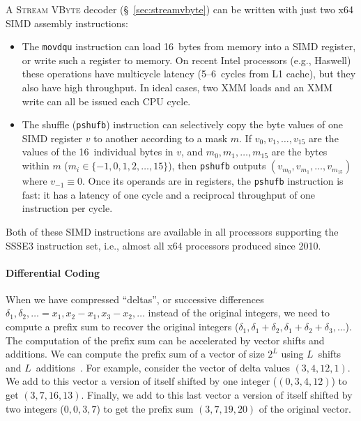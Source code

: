 \documentclass[compress]{elsarticle}
\newcommand{\vbyte}{VByte}
\newcommand{\streamvbyte}{\textsc{Stream \vbyte{}}}
\begin{document}
A \streamvbyte{} decoder (\S~\ref{sec:streamvbyte}) can be written with  just two x64 SIMD assembly instructions:
\begin{itemize}[noitemsep,nolistsep,leftmargin=10pt]
\item The \texttt{movdqu} instruction can load 16~bytes from memory into a SIMD register, or write such a register to memory. On recent Intel processors (e.g., Haswell) these operations have multicycle latency (5--6~cycles from L1 cache), but they also have high   throughput.
In ideal cases, two XMM loads and an XMM write can all be issued each CPU cycle.
\item The shuffle (\texttt{pshufb}) instruction  can selectively copy the
byte values of one SIMD register  $v$ to another according to a mask $m$.
If $v_0, v_1, \ldots, v_{15}$ are the values of the 16~individual bytes in $v$,  and $m_0, m_1, \ldots, m_{15}$ are the bytes within $m$ ($m_i\in\{-1,0,1,2,\ldots, 15\}$), then \texttt{pshufb} outputs $(v_{m_0},v_{m_1},\ldots, v_{m_{15}})$ where $v_{-1}\equiv 0$. Once its operands are in registers, the  \texttt{pshufb} instruction is fast: it has a latency of one cycle and a reciprocal throughput of one instruction per cycle.
\end{itemize}
Both of these SIMD instructions are available in all processors supporting the SSSE3 instruction set, i.e., almost all x64 processors produced since 2010.


\paragraph{Differential Coding} When we have compressed ``deltas'', or successive differences $\delta_1, \delta_2, \ldots = x_1, x_2-x_1, x_3-x_2, \ldots$
 instead of the original integers, we need to compute
 a prefix sum to recover the original integers ($\delta_1, \delta_1+\delta_2, \delta_1 + \delta_2 + \delta_3, \ldots$).
The computation of the prefix sum can be accelerated by vector shifts and additions.
We can compute the prefix sum of a vector of size $2^L$ using $L$~shifts and $L$~additions~\cite{SPE:SPE2326}. For example, consider the vector of 
delta values $(3,4,12,1)$. We add to this vector a version of itself shifted by one integer ($(0,3,4,12)$) to get $(3,7,16,13)$. Finally, we add to this last vector a version of itself shifted by two integers ($0,0,3,7$) to get the prefix sum $(3,7,19,20)$ of the original vector. 
  
\end{document}
